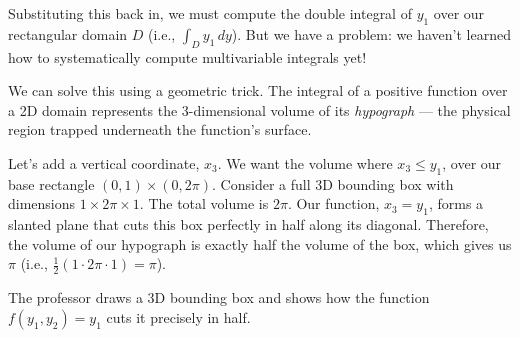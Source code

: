 \begin{spoken-clean}[00:22:55 - 00:26:33]
Substituting this back in, we must compute the double integral of $y_1$ over our rectangular domain $D$ (i.e., $\int_D y_1 \, dy$). But we have a problem: we haven't learned how to systematically compute multivariable integrals yet! 

We can solve this using a geometric trick. The integral of a positive function over a 2D domain represents the 3-dimensional volume of its \textit{hypograph} — the physical region trapped underneath the function's surface. 

Let's add a vertical coordinate, $x_3$. We want the volume where $x_3 \le y_1$, over our base rectangle $(0,1) \times (0, 2\pi)$. 
Consider a full 3D bounding box with dimensions $1 \times 2\pi \times 1$. The total volume is $2\pi$. Our function, $x_3 = y_1$, forms a slanted plane that cuts this box perfectly in half along its diagonal. Therefore, the volume of our hypograph is exactly half the volume of the box, which gives us $\pi$ (i.e., $\frac{1}{2} (1 \cdot 2\pi \cdot 1) = \pi$).
\end{spoken-clean}

\begin{nice-box}
The professor draws a 3D bounding box and shows how the function $f(y_1, y_2) = y_1$ cuts it precisely in half.
\end{nice-box}


